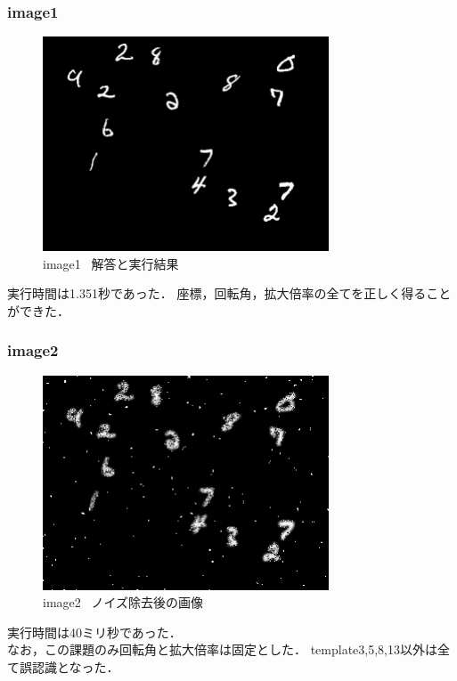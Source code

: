 \documentclass[uplatex,dvipdfmx]{jsarticle}
\begin{document}
\subsubsection{image1}
\begin{figure}[h]
\centering
\includegraphics[clip,width = 8.5cm]{images/image1.png}
\caption{image1~ 解答と実行結果}
\label{graph1}
\end{figure}


実行時間は1.351秒であった．
座標，回転角，拡大倍率の全てを正しく得ることができた．

\subsubsection{image2}
\begin{figure}[h]
\centering
\includegraphics[clip,width = 8.5cm]{images/image2.png}
\caption{image2~ ノイズ除去後の画像}
\label{graph2}
\end{figure}


実行時間は40ミリ秒であった．\\
なお，この課題のみ回転角と拡大倍率は固定とした．
template3,5,8,13以外は全て誤認識となった．
\end{document}
